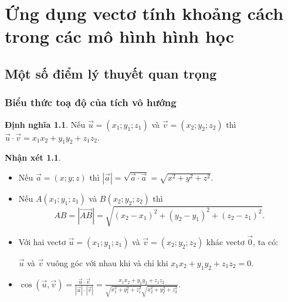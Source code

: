 \documentclass[12pt,a4paper,oneside]{book}
\theoremstyle{theorem}
\theoremstyle{definition}
\newtheorem{dn}[theorem2]{Định nghĩa}
\newtheorem{nx}[theorem2]{Nhận xét}
\begin{document}
	\fontsize{13pt}{18pt}\selectfont %
	\setlength{\baselineskip}{26truept}
	\pagestyle{empty}

  
    \chapter{Ứng dụng vectơ tính khoảng cách trong các mô hình hình học}
    \section{Một số điểm lý thuyết quan trọng}
    \subsection{Biểu thức toạ độ của tích vô hướng}
    \begin{dn}
        Nếu $\vec{u}=(x_1;y_1;z_1)$ và $\vec{v}=(x_2;y_2;z_2)$ thì $\vec{u}\cdot\vec{v}=x_1x_2+y_1y_2+z_1z_2$.
    \end{dn}
    \begin{nx}
        \begin{itemize}
            \item Nếu $\vec{a}=(x;y;z)$ thì $|\vec{a}|=\sqrt{\vec{a}\cdot\vec{a}}=\sqrt{x^2+y^2+z^2}$.
            \item Nếu $A(x_1;y_1;z_1)$ và $B(x_2;y_2;z_2)$ thì
            \[
            AB=|\overrightarrow{AB}|=\sqrt{(x_2-x_1)^2+(y_2-y_1)^2+(z_2-z_1)^2}.
            \]
            \item Với hai vectơ $\vec{u}=(x_1;y_1;z_1)$ và $\vec{v}=(x_2;y_2;z_2)$ khác vectơ $\vec{0}$, ta có:

            $\vec{u}$ và $\vec{v}$ vuông góc với nhau khi và chỉ khi $x_1x_2+y_1y_2+z_1z_2=0$.
            \item $\cos(\vec{u},\vec{v})
                =\displaystyle \frac{\vec{u}\cdot\vec{v}}{|\vec{u}|\cdot|\vec{v}|}
                =\frac{x_1x_2+y_1y_2+z_1z_2}
                {\sqrt{x_1^2+y_1^2+z_1^2}\sqrt{x_2^2+y_2^2+z_2^2}}.$
        \end{itemize}
    \end{nx}
\end{document}
